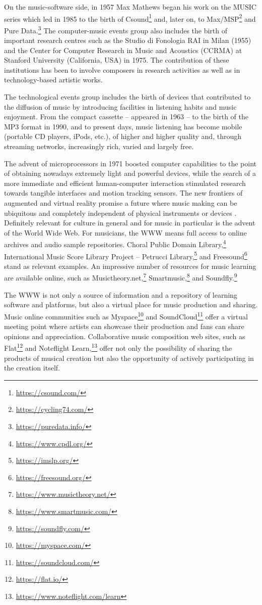 \documentclass[10pt,journal,compsoc]{IEEEtran}
\begin{document}
On the music-software side, in 1957 Max Mathews began his work on the MUSIC series which led in 1985 to the birth of Csound\footnote{\url{https://csound.com/}} and, later on, to Max/MSP\footnote{\url{https://cycling74.com/}} and Pure Data.\footnote{\url{https://puredata.info/}} The computer-music events group also includes the birth of important research centres such as the Studio di Fonologia RAI in Milan (1955) and the Center for Computer Research in Music and Acoustics (CCRMA) at Stanford University (California, USA) in 1975. The contribution of these institutions has been to involve composers in research activities as well as in technology-based artistic works.  

The technological events group includes the birth of devices that contributed to the diffusion of music by introducing facilities in listening habits and music enjoyment. From the compact cassette -- appeared in 1963 -- to the birth of the MP3 format in 1990, and to present days, music listening has become mobile (portable CD players, iPods, etc.), of higher and higher quality and, through streaming networks, increasingly rich, varied and largely free. 

The advent of microprocessors in 1971 boosted computer capabilities to the point of obtaining nowadays extremely light and powerful devices, while the search of a more immediate and efficient human-computer interaction stimulated research towards tangible interfaces and motion tracking sensors. The new frontiers of augmented and virtual reality promise a future where music making can be ubiquitous and completely independent of physical instruments or devices \cite{serafin2016virtual}. Definitely relevant for culture in general and for music in particular is the advent of the World Wide Web. For musicians, the WWW means full access to online archives and audio sample repositories. Choral Public Domain Library,\footnote{\url{https://www.cpdl.org/}} International Music Score Library Project -- Petrucci Library,\footnote{\url{https://imslp.org/}} and Freesound\footnote{\url{https://freesound.org/}} stand as relevant examples. An impressive number of resources for music learning are available online, such as Musictheory.net,\footnote{\url{https://www.musictheory.net/}} Smartmusic,\footnote{\url{https://www.smartmusic.com/}} and Soundfly.\footnote{\url{https://soundfly.com/}}

The WWW is not only a source of information and a repository of learning software and platforms, but also a virtual place for music production and sharing. Music online communities such as Myspace\footnote{\url{https://myspace.com/}} and SoundCloud\footnote{\url{https://soundcloud.com/}} offer a virtual meeting point where artists can showcase their production and fans can share opinions and appreciation. Collaborative music composition web sites, such as Flat\footnote{\url{https://flat.io/}} and Noteflight Learn,\footnote{\url{https://www.noteflight.com/learn}} offer not only the possibility of sharing the products of musical creation but also the opportunity of actively participating in the creation itself.
\end{document}
